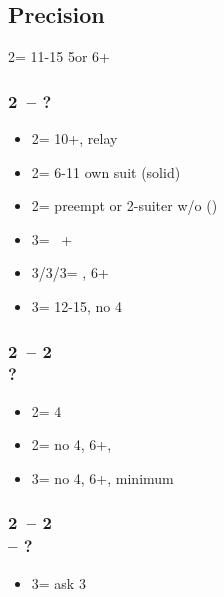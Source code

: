 \documentclass[12pt, a4paper]{report}
\begin{document}
\begin{bidpage}
\section{Precision}

2\clubs = 11-15 5\major or 6+\clubs

\subsubsection*{2\clubs\ -- ?}
\begin{itemize}
    \item 2\diams = 10+, relay
    \item 2\major = 6-11 own suit (solid)
    \item 2\nt = preempt \clubs or 2-suiter w/o \clubs (\clubs)
    \item 3\clubs = \inv\ + \clubs
    \item 3\diams/3\hearts/3\spades = \inv, 6+
    \item 3\nt = 12-15, no 4\major
\end{itemize}
\end{bidpage}

\begin{bidpage}
\subsubsection*{2\clubs\ -- 2\diams\\
                ?}
\begin{itemize}
    \item 2\major = 4\major
    \item 2\nt = no 4\major, 6+\clubs, \gf
    \item 3\clubs = no 4\major, 6+\clubs, minimum
\end{itemize}
\end{bidpage}

\begin{bidpage}
\subsubsection*{2\clubs\ -- 2\diams\\
                \anysuit{\textbullet} -- ?}
\begin{itemize}
    \item 3\diams = ask 3\major
\end{itemize}
\end{bidpage}
\end{document}
